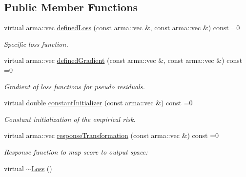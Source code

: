 \subsection*{Public Member Functions}
\begin{DoxyCompactItemize}
\item 
virtual arma\+::vec \mbox{\hyperlink{classloss_1_1_loss_ae9f94dd9b8311397583ba3a9cb485e94}{defined\+Loss}} (const arma\+::vec \&, const arma\+::vec \&) const =0
\begin{DoxyCompactList}\small\item\em Specific loss function. \end{DoxyCompactList}\item 
virtual arma\+::vec \mbox{\hyperlink{classloss_1_1_loss_a267a4de70747ade4b2d84ce35a448979}{defined\+Gradient}} (const arma\+::vec \&, const arma\+::vec \&) const =0
\begin{DoxyCompactList}\small\item\em Gradient of loss functions for pseudo residuals. \end{DoxyCompactList}\item 
virtual double \mbox{\hyperlink{classloss_1_1_loss_a65fe7dcd9370e6a549b8d1cc95fc8798}{constant\+Initializer}} (const arma\+::vec \&) const =0
\begin{DoxyCompactList}\small\item\em Constant initialization of the empirical risk. \end{DoxyCompactList}\item 
virtual arma\+::vec \mbox{\hyperlink{classloss_1_1_loss_a0a84b7df79b08e40b538aaa7e6ee75c4}{response\+Transformation}} (const arma\+::vec \&) const =0
\begin{DoxyCompactList}\small\item\em Response function to map score to output space\+: \end{DoxyCompactList}\item 
virtual \mbox{\hyperlink{classloss_1_1_loss_a868a7908fd97590b6c4fc69f4eb3c570}{$\sim$\+Loss}} ()
\end{DoxyCompactItemize}
